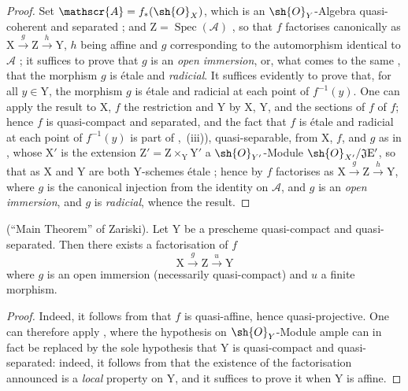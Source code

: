 \begin{proof}
Set $\mathscr{A}=f_*(\sh{O}_X)$, which is an $\sh{O}_Y$-Algebra quasi-coherent and separated ; and $\mathrm{Z}=\operatorname{Spec}(\mathscr{A})$ , so that $f$ factorises canonically as $\mathrm{X}\xrightarrow{g}\mathrm{Z}\xrightarrow{h}\mathrm{Y}$, $h$ being affine and $g$ corresponding to the automorphism identical to $\mathscr{A}$ ; it suffices to prove that $g$ is an \emph{open immersion}, or, what comes to the same , that the morphism $g$ is \'etale and \emph{radicial}.
It suffices evidently to prove that, for all $y\in\mathrm{Y}$, the morphism $g$ is \'etale and radicial at each point of $f^{-1}(y)$.
One can apply the result to $\mathrm{X}$, $f$ the restriction and $\mathrm{Y}$ by $\mathrm{X}$, $\mathrm{Y}$, and the sections of $f$ of $f$; hence $f$ is quasi-compact and separated, and the fact that $f$ is \'etale and radicial at each point of $f^{-1}(y)$ is part of ,~(iii)), quasi-separable,  from $\mathrm{X}$, $f$, and $g$ as in , whose $\mathrm{X}'$ is the extension $\mathrm{Z}'=\mathrm{Z}\times_{\mathrm{Y}}\mathrm{Y}'$ a $\sh{O}_{Y'}$-Module $\sh{O}_{X'}/\mathfrak{J}\mathrm{E}'$, so that as $\mathrm{X}$ and $\mathrm{Y}$ are both $\mathrm{Y}$-schemes \'etale ; hence by  $f$ factorises as $\mathrm{X}\xrightarrow{g}\mathrm{Z}\xrightarrow{h}\mathrm{Y}$, where $g$ is the canonical injection from the identity on $\mathscr{A}$, and $g$ is an \emph{open immersion}, and $g$ is \emph{radicial}, whence the result.
\end{proof}

\begin{corollary}[18.12.13]
\label{IV.18.12.13}
(``Main Theorem'' of Zariski).
Let $\mathrm{Y}$ be a prescheme quasi-compact and quasi-separated.
Then there exists a factorisation of $f$
\[
  \mathrm{X}\xrightarrow{g}\mathrm{Z}\xrightarrow{u}\mathrm{Y}
\]
where $g$ is an open immersion (necessarily quasi-compact) and $u$ a finite morphism.
\end{corollary}

\begin{proof}
Indeed, it follows from  that $f$ is quasi-affine, hence quasi-projective.
One can therefore apply , where the hypothesis on $\sh{O}_Y$-Module ample can in fact be replaced by the sole hypothesis that $\mathrm{Y}$ is quasi-compact and quasi-separated: indeed, it follows from  that the existence of the factorisation announced is a \emph{local} property on $\mathrm{Y}$, and it suffices to prove it when $\mathrm{Y}$ is affine.
\end{proof}

